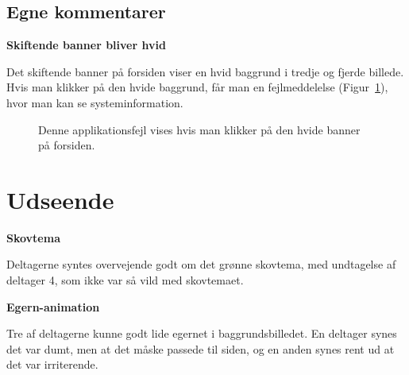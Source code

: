 \documentclass[10pt,a4paper]{article}      %
\newcommand\pic[1]{\texttt{[image: Pics/\#1]}}
\renewcommand\good{\pic{good}}
\renewcommand\smallproblem{\pic{smallproblem}}
\renewcommand\seriousproblem{\pic{seriousproblem}}
\begin{document}
\subsection{Egne kommentarer} %
\label{sub:Egne kommentarer forsiden}

\begin{kommentarer}
  \item[\seriousproblem]{\textbf{Skiftende banner bliver hvid}}

  Det skiftende banner på forsiden viser en hvid baggrund i tredje og fjerde
  billede. Hvis man klikker på den hvide baggrund, får man en fejlmeddelelse
  (Figur~\ref{fig:fejlmeddelelse}), hvor man kan se systeminformation.
\end{kommentarer}

\begin{figure}[htbp]
    \centering
    \caption{Denne applikationsfejl vises hvis man klikker på den hvide banner
    på forsiden.}
    \label{fig:fejlmeddelelse}
\end{figure}

\section{Udseende}
\begin{kommentarer}
  \item[\good]{\textbf{Skovtema}}
  
  Deltagerne syntes overvejende godt om det grønne skovtema, med
  undtagelse af deltager 4, som ikke var så vild med skovtemaet.

  \item[\smallproblem]{\textbf{Egern-animation}} 
  
  Tre af deltagerne kunne godt lide egernet i baggrundsbilledet. En deltager
  synes det var dumt, men at det måske passede til siden, og en anden synes rent
  ud at det var irriterende.
\end{kommentarer}
\end{document}
